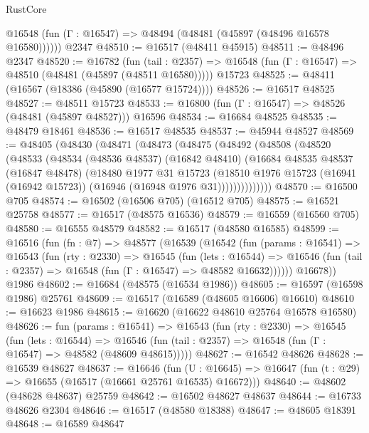 \begin{lexlean}{RustCore}
\begin{coremodule}
      @16548 (fun (Γ : @16547) => @48494 (@48481 (@45897 (@48496 @16578 @16580))))))
    @2347
@48510 := @16517 (@48411 @45915)
@48511 := @48496 @2347
@48520 := @16782
    (fun (tail : @2357) => @16548 (fun (Γ : @16547) => @48510 (@48481 (@45897 (@48511 @16580)))))
    @15723
@48525 := @48411 (@16567 (@18386 (@45890 (@16577 @15724))))
@48526 := @16517 @48525
@48527 := @48511 @15723
@48533 := @16800 (fun (Γ : @16547) => @48526 (@48481 (@45897 @48527))) @16596
@48534 := @16684 @48525
@48535 := @48479 @18461
@48536 := @16517 @48535
@48537 := @45944 @48527
@48569 := @48405
    (@48430
      (@48471
        (@48473
          (@48475
            (@48492
              (@48508
                (@48520
                  (@48533
                    (@48534
                      (@48536 @48537)
                      (@16842 @48410)
                      (@16684
                        @48535
                        @48537
                        (@16847 @48478)
                        (@18480
                          @1977
                          @31
                          @15723
                          (@18510
                            @1976
                            @15723
                            (@16941 (@16942 @15723))
                            (@16946 (@16948 @1976 @31))))))))))))))
@48570 := @16500 @705
@48574 := @16502 (@16506 @705) (@16512 @705)
@48575 := @16521 @25758
@48577 := @16517 (@48575 @16536)
@48579 := @16559 (@16560 @705)
@48580 := @16555 @48579
@48582 := @16517 (@48580 @16585)
@48599 := @16516
    (fun (fn : @7) =>
    @48577
      (@16539
        (@16542
          (fun (params : @16541) =>
          @16543
            (fun (rty : @2330) =>
            @16545
              (fun (lets : @16544) =>
              @16546 (fun (tail : @2357) => @16548 (fun (Γ : @16547) => @48582 @16632))))))
        @16678))
    @1986
@48602 := @16684 (@48575 (@16534 @1986))
@48605 := @16597 (@16598 @1986) @25761
@48609 := @16517 (@16589 (@48605 @16606) @16610)
@48610 := @16623 @1986
@48615 := @16620 (@16622 @48610 @25764 @16578 @16580)
@48626 := fun (params : @16541) =>
  @16543
    (fun (rty : @2330) =>
    @16545
      (fun (lets : @16544) =>
      @16546 (fun (tail : @2357) => @16548 (fun (Γ : @16547) => @48582 (@48609 @48615)))))
@48627 := @16542 @48626
@48628 := @16539 @48627
@48637 := @16646
    (fun (U : @16645) => @16647 (fun (t : @29) => @16655 (@16517 (@16661 @25761 @16535) @16672)))
@48640 := @48602 (@48628 @48637) @25759
@48642 := @16502 @48627 @48637
@48644 := @16733 @48626 @2304
@48646 := @16517 (@48580 @18388)
@48647 := @48605 @18391
@48648 := @16589 @48647

\end{coremodule}
\end{lexlean}
